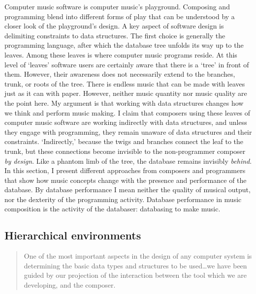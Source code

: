 Computer music software is computer music's playground. Composing and programming blend into different forms of play that can be understood by a closer look of the playground's design. A key aspect of software design is delimiting constraints to data structures. The first choice is generally the programming language, after which the database tree unfolds its way up to the leaves. Among these leaves is where computer music programs reside. At this level of `leaves' software users are certainly aware that there is a `tree' in front of them. However, their awareness does not necessarily extend to the branches, trunk, or roots of the tree. There is endless music that can be made with leaves just as it can with paper. However, neither music quantity nor music quality are the point here. My argument is that working with data structures changes how we think and perform music making. I claim that composers using these leaves of computer music software are working indirectly with data structures, and unless they engage with programming, they remain unaware of data structures and their constraints. `Indirectly,' because the twigs and branches connect the leaf to the trunk, but these connections become invisible to the non-programmer composer \textit{by design}. Like a phantom limb of the tree, the database remains invisibly \textit{behind}. In this section, I present different approaches from composers and programmers that show how music concepts change with the presence and performance of the database. By database performance I mean neither the quality of musical output, nor the dexterity of the programming activity. Database performance in music composition is the activity of the databaser: databasing to make music.


\subsection{Hierarchical environments}
\label{computer:sssp}

	\begin{quote}
		One of the most important aspects in the design of any computer system is determining the basic data types and structures to be used\dots we have been guided by our projection of the interaction between the tool which we are developing, and the composer. \parencite[119]{icmc/bbp2372.1978.012}
	\end{quote}

